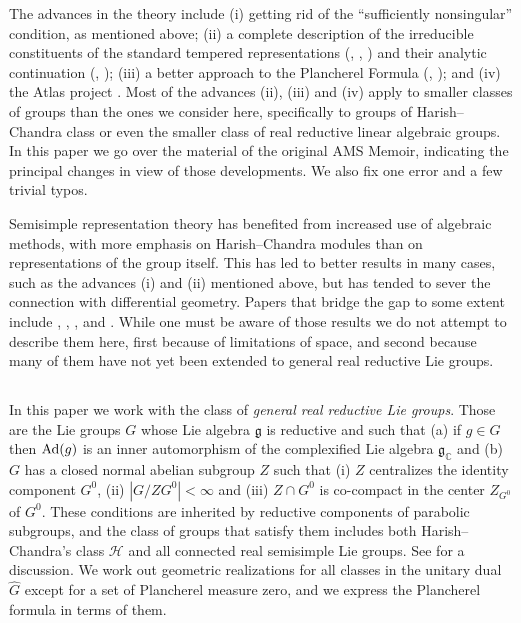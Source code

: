 \documentclass{conm-p-l}
\renewcommand{\gg}{\mathfrak{g}}
\def\gg{\mathfrak{g}}
\def\Ad{{\rm Ad}}
\def\C{\mathbb{C}}
\def\cH{\mathcal{H}}
\begin{document}
The advances in the theory include (i) getting rid of the ``sufficiently 
nonsingular'' condition, as mentioned above; (ii) a complete description of 
the irreducible constituents of the standard tempered representations
(\cite{L1973}, \cite{KZ1982a}, \cite{KZ1982b}) and their analytic continuation 
(\cite{V1983a}, \cite{V1983b});
(iii) a better approach to the Plancherel Formula (\cite{HW1986a},
\cite{HW1986b}); and (iv) the Atlas project \cite{ALTV2015}.  Most of the 
advances (ii), (iii) and (iv) apply to smaller classes of groups than the
ones we consider here, specifically to groups of Harish--Chandra class or
even the smaller class of real reductive linear algebraic groups.
In this paper we go over the material of the original AMS Memoir,
indicating the principal changes in view of those developments.  We
also fix one error and a few trivial typos.

Semisimple representation theory has benefited from increased use of
algebraic methods, with more emphasis on Harish--Chandra modules than on
representations of the group itself.  This has led to better results in 
many cases, such as the advances (i) and (ii) mentioned above, but has 
tended to sever the connection with differential geometry.  Papers that 
bridge the gap to some extent include \cite{HMSW1987}, \cite{SW1987},
\cite{SW1990}, \cite{W1995} and \cite{W1999}.  While one must be aware of
those results we do not attempt to describe them here, first because of
limitations of space, and second because many of them 
have not yet been extended to general real reductive Lie groups.

\subsection{}\label{ssec0a}  
\setcounter{equation}{0}
In this paper we work with the class of 
{\em general real reductive Lie groups}.  Those are the
Lie groups $G$ whose Lie algebra $\gg$ is reductive and such that
(a) if $g \in G$ then $\Ad(g)$ is an inner automorphism of the complexified
Lie algebra $\gg_\C$ and (b) $G$ has a closed normal abelian subgroup
$Z$ such that (i) $Z$ centralizes the identity component $G^0$, (ii) 
$|G/ZG^0| < \infty$ and (iii) $Z \cap G^0$ is co-compact in the center
$Z_{G^0}$ of $G^0$.  These conditions are inherited by reductive components
of parabolic subgroups, and the class of groups that satisfy them includes
both Harish--Chandra's class $\cH$ and all connected real semisimple Lie
groups.  See \cite[\S 0.3]{W1973} for a discussion.  
We work out geometric realizations  for all classes
in the unitary dual $\widehat{G}$ except for a set of Plancherel measure
zero, and we express the Plancherel formula in terms of them.
\end{document}
